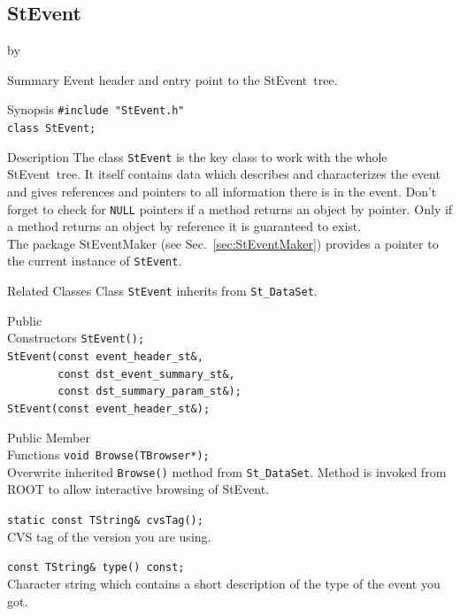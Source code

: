 \documentclass[twoside]{article}
\newcommand{\StEvent}{\textsf{StEvent}}
\newcommand{\entrylabel}[1]{\mbox{\textbf{{#1}}}\hfil}%
\newenvironment{entry}
{\begin{list}{}%
    {\renewcommand{\makelabel}{\entrylabel}%
     \setlength{\labelwidth}{90pt}%
     \setlength{\leftmargin}{\labelwidth}
     \advance\leftmargin by \labelsep%
      }%
    }%
  {\end{list}}
\newcommand{\Entrylabel}[1]%
{\raisebox{0pt}[1ex][0pt]{\makebox[\labelwidth][l]%
    {\parbox[t]{\labelwidth}{\hspace{0pt}\textbf{{#1}}}}}}
\newenvironment{Entry}%
{\renewcommand{\entrylabel}{\Entrylabel}\begin{entry}}%
  {\end{entry}}
\begin{document}
\subsection{StEvent}
\label{sec:StEvent}
\begin{Entry}
\item[Summary] Event header and entry point to the \StEvent\ tree.
\item[Synopsis]
    \verb+#include "StEvent.h"+\\
    \verb+class StEvent;+\\
\item[Description] The class \texttt{StEvent} is the key class to work
    with the whole \StEvent\ tree. It itself contains data which
    describes and characterizes the event and gives references and
    pointers to all information there is in the event.  Don't forget
    to check for \texttt{NULL} pointers if a method returns an object
    by pointer. Only if a method returns an object by reference
    it is guaranteed to exist.\\
    The package StEventMaker (see Sec.~\ref{sec:StEventMaker})
    provides a pointer to the current instance of \texttt{StEvent}.
\item[Related Classes] Class \texttt{StEvent} inherits from
    \texttt{St\_DataSet}.
\item[Public\\ Constructors]
    \verb+StEvent();+\\
    
    \verb+StEvent(const event_header_st&,+\\
    \verb+        const dst_event_summary_st&,+\\
    \verb+        const dst_summary_param_st&);+\\
    
    \verb+StEvent(const event_header_st&);+\\
    
\item[Public Member\\ Functions]
    \verb+void Browse(TBrowser*);+\\
    Overwrite inherited \texttt{Browse()} method from \texttt{St\_DataSet}.
    Method is invoked from ROOT to allow interactive browsing of \StEvent. 

    \verb+static const TString& cvsTag();+\\
    CVS tag of the version you are using.
    
    \verb+const TString& type() const;+\\
    Character string which contains a short description of the type of
    the event you got.
    

\end{Entry}
\end{document}
